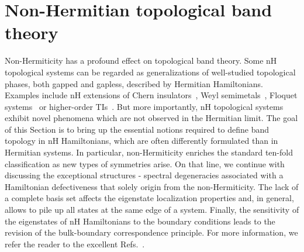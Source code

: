 \section{Non-Hermitian topological band theory}
\label{sec:nh-bands}
Non-Hermiticity has a profound effect on topological band theory. Some nH topological systems can be regarded as generalizations of well-studied topological phases, both gapped and gapless, described by Hermitian Hamiltonians. Examples include nH extensions of Chern insulators~\cite{PhysRevLett.120.146402,PhysRevLett.121.136802}, Weyl semimetals~\cite{PhysRevResearch.1.012003}, Floquet systems~\cite{PhysRevB.101.045415, PhysRevResearch.2.023235} or higher-order TIs~\cite{PhysRevLett.122.076801, PhysRevB.99.201411, PhysRevB.99.081302}. But more importantly, nH topological systems exhibit novel phenomena which are not observed in the Hermitian limit. The goal of this Section is to bring up the essential notions required to define band topology in nH Hamiltonians, which are often differently formulated than in Hermitian systems. In particular, non-Hermiticity enriches the standard ten-fold classification as new types of symmetries arise. On that line, we continue with discussing the exceptional structures - spectral degeneracies associated with a Hamiltonian defectiveness that solely origin from the non-Hermiticity. The lack of a complete basis set affects the eigenstate localization properties and, in general, allows to pile up all states at the same edge of a system. Finally, the sensitivity of the eigenstates of nH Hamiltonians to the boundary conditions leads to the revision of the bulk-boundary correspondence principle. For more information, we refer the reader to the excellent Refs.~\cite{bergholtz2019exceptional, ashida2020nonhermitian}.

